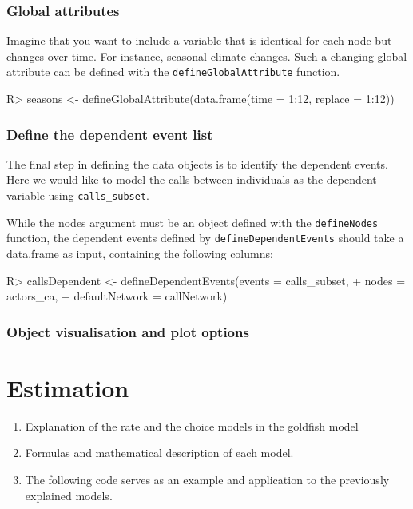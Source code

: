 \documentclass[article]{jss}
\begin{document}
\subsubsection[Global attributes]{\textbf{Global attributes} \label{subsubsec:glogal_attr}}

Imagine that you want to include a variable that is identical for each node but changes over time. For instance, seasonal climate changes. Such a changing global attribute can be defined with the \texttt{defineGlobalAttribute} function.

%
\begin{Schunk}
\begin{Sinput}
R> seasons <- defineGlobalAttribute(data.frame(time = 1:12, replace = 1:12))
\end{Sinput}
\end{Schunk}
%



\subsubsection[Define the dependent event list]{\textbf{Define the dependent event list}} \label{subsubsec:event_list}

The final step in defining the data objects is to identify the dependent events. Here we would like to model the calls between individuals as the dependent variable using \texttt{calls\_subset}.

While the nodes argument must be an object defined with the \texttt{defineNodes} function, the dependent events defined by \texttt{defineDependentEvents} should take a data.frame as input, containing the following columns: 
%
\begin{Schunk}
\begin{Sinput}
R> callsDependent <- defineDependentEvents(events = calls_subset, 
+                                          nodes = actors_ca, 
+                                          defaultNetwork = callNetwork)
\end{Sinput}
\end{Schunk}
%

\subsubsection[Object visualisation and plot options]{\textbf{Object visualisation and plot options}} \label{subsubsec:plot_options}



\section[Estimation]{Estimation} \label{subsec:estim}
\begin{enumerate}[-]
\item Explanation of the rate and the choice models in the goldfish model 
\item Formulas and mathematical description of each model. 
\item The following code serves as an example and application to the previously explained models. 
\end{enumerate}
\end{document}
